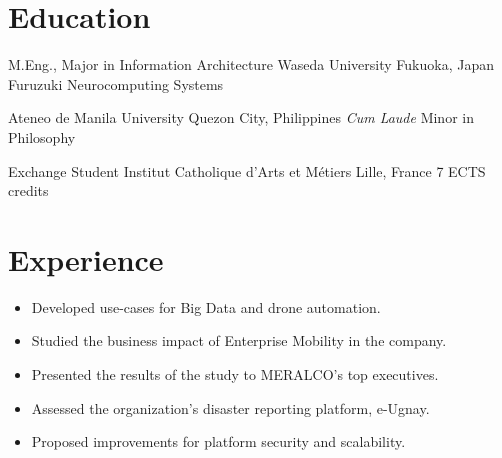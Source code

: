 \documentclass[11pt,a4paper,sans]{moderncv}
\begin{document}
\vspace*{-6mm}
\maketitle
\vspace*{-6mm}

\section{Education}
        {M.Eng., Major in Information Architecture}
        {Waseda University}
        {Fukuoka, Japan}{}
        {Furuzuki Neurocomputing Systems}

        {Ateneo de Manila University}
        {Quezon City, Philippines}
        {\textit{Cum Laude}}
        {Minor in Philosophy}

        {Exchange Student}
        {Institut Catholique d'Arts et M\'etiers}
        {Lille, France}{}
        {7 ECTS credits}

\section{Experience}
\vspace{-.1cm}
\cvline{}
{\begin{itemize} 
    \item Developed use-cases for Big Data and drone automation.
    \item Studied the business impact of Enterprise Mobility in the company.
    \item Presented the results of the study to MERALCO's top executives.
\end{itemize}}
\vspace{-.5cm}

\vspace{-.1cm}
\cvline{}
{\begin{itemize}
    \item Assessed the organization's disaster reporting platform, e-Ugnay.
    \item Proposed improvements for platform security and scalability.
\end{itemize}}
\vspace{-.5cm}
\end{document}
